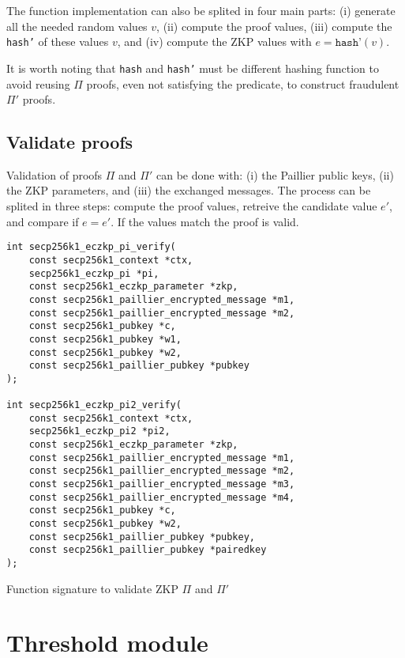 The function implementation can also be splited in four main parts: (i) generate all
the needed random values $v$, (ii) compute the proof values, (iii) compute the \texttt{hash'}
of these values $v$, and (iv) compute the ZKP values with $e = \texttt{hash'}(v)$.

It is worth noting that \texttt{hash} and \texttt{hash'} must be different hashing
function to avoid reusing $\Pi$ proofs, even not satisfying the predicate, to construct
fraudulent $\Pi'$ proofs.

\subsection{Validate proofs}

Validation of proofs $\Pi$ and $\Pi'$ can be done with: (i) the Paillier public keys,
(ii) the ZKP parameters, and (iii) the exchanged messages. The process can be splited
in three steps: compute the proof values, retreive the candidate value $e'$, and
compare if $e = e'$. If the values match the proof is valid.

\begin{listing}
  \begin{verbatim}
int secp256k1_eczkp_pi_verify(
    const secp256k1_context *ctx,
    secp256k1_eczkp_pi *pi,
    const secp256k1_eczkp_parameter *zkp,
    const secp256k1_paillier_encrypted_message *m1,
    const secp256k1_paillier_encrypted_message *m2,
    const secp256k1_pubkey *c,
    const secp256k1_pubkey *w1,
    const secp256k1_pubkey *w2,
    const secp256k1_paillier_pubkey *pubkey
);

int secp256k1_eczkp_pi2_verify(
    const secp256k1_context *ctx,
    secp256k1_eczkp_pi2 *pi2,
    const secp256k1_eczkp_parameter *zkp,
    const secp256k1_paillier_encrypted_message *m1,
    const secp256k1_paillier_encrypted_message *m2,
    const secp256k1_paillier_encrypted_message *m3,
    const secp256k1_paillier_encrypted_message *m4,
    const secp256k1_pubkey *c,
    const secp256k1_pubkey *w2,
    const secp256k1_paillier_pubkey *pubkey,
    const secp256k1_paillier_pubkey *pairedkey
);
  \end{verbatim}
	\caption{Function signature to validate ZKP $\Pi$ and $\Pi'$}
	\label{lst:funcSigValidatePiPi2}
\end{listing}


\section{Threshold module}

